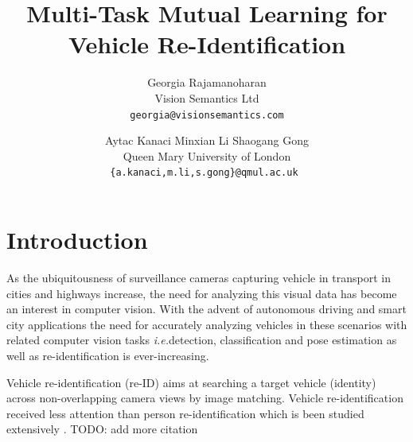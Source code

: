 \documentclass[10pt,twocolumn,letterpaper]{article}
\def\ie{\emph{i.e.\hspace{0.3em}}}
\newcommand{\todo}[1]{}
\renewcommand{\todo}[1]{{\color{red} TODO: {#1}}}
\begin{document}
\title{Multi-Task Mutual Learning for Vehicle Re-Identification}

\author{Georgia Rajamanoharan\\
Vision Semantics Ltd\\
{\tt\small georgia@visionsemantics.com}
\and
Aytac Kanaci \hspace{0.7cm}
Minxian Li  \hspace{0.7cm}
Shaogang Gong\\
Queen Mary University of London\\
{\tt\small \{a.kanaci,m.li,s.gong\}@qmul.ac.uk }
}

\maketitle

\begin{abstract}

\end{abstract}

\section{Introduction}

As the ubiquitousness of surveillance cameras capturing vehicle in transport in
cities and highways increase, the need for analyzing this visual data has
become an interest in computer vision. With the advent of autonomous driving
and smart city applications the need for accurately analyzing vehicles in these
scenarios with related computer vision tasks \ie detection, classification and
pose estimation as well as re-identification is ever-increasing.

Vehicle re-identification (re-ID) aims at searching a target vehicle
(identity) across non-overlapping camera views by image matching.
Vehicle re-identification received less attention than person re-identification
which is been studied extensively \cite{gong2014re, Li2018Harmonious,
chen2017person}.\todo{add more citation}
\end{document}
